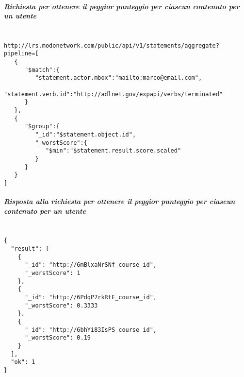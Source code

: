     \subparagraph*{Richiesta per ottenere il peggior punteggio per ciascun contenuto per un utente\\\\}
    \begin{lstlisting}
http://lrs.modonetwork.com/public/api/v1/statements/aggregate?pipeline=[
   {
      "$match":{
         "statement.actor.mbox":"mailto:marco@email.com",
         "statement.verb.id":"http://adlnet.gov/expapi/verbs/terminated"
      }
   },
   {
      "$group":{
         "_id":"$statement.object.id",
         "_worstScore":{
            "$min":"$statement.result.score.scaled"
         }
      }
   }
]
    \end{lstlisting}
    \subparagraph*{Risposta alla richiesta per ottenere il  peggior punteggio per ciascun contenuto per un utente\\\\}
    \begin{lstlisting}
{
  "result": [
    {
      "_id": "http://6mBlxaNrSNf_course_id",
      "_worstScore": 1
    },
    {
      "_id": "http://6PdqP7rkRtE_course_id",
      "_worstScore": 0.3333
    },
    {
      "_id": "http://6bhYi83IsPS_course_id",
      "_worstScore": 0.19
    }
  ],
  "ok": 1
}
    \end{lstlisting}